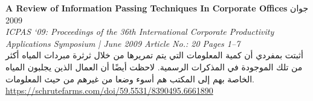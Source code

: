 \foreignlanguage{english}{\textbf{A Review of Information Passing Techniques In Corporate Offices}} \hfill جوان 2009\\
\foreignlanguage{english}{\textit{ICPAS ‘09: Proceedings of the 36th International Corporate Productivity Applications Symposium | June 2009 Article No.: 20 Pages 1–7}}\\
أثبتت بمفردي أن كمية المعلومات التي يتم تمريرها من خلال ثرثرة مبردات المياه أكثر من تلك الموجودة في المذكرات الرسمية. لاحظت أيضًا أن العمال الذين يجلبون المياه الخاصة بهم إلى المكتب هم أسوء وضعا من غيرهم من حيث المعلومات.\\
\foreignlanguage{english}{\href{https://schrutefarms.com/doi/59.5531/8390495.6661890}{https://schrutefarms.com/doi/59.5531/8390495.6661890}}
\vspace*{2mm}